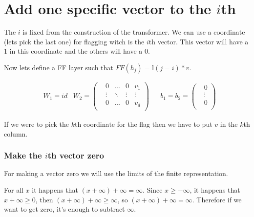 \section*{Add one specific vector to the $i$th}

The $i$ is fixed from the construction of the transformer. We can use a coordinate (lets pick the last one) for flagging witch is the $i$th vector. This vector will have a 1 in this coordinate and the others  will have a 0.

Now lets define a FF layer such that $FF(h_j) = \mathbb{I}(j=i)*v$.

\begin{align*}
    & W_1 = id
    & W_2  = \left(\begin{matrix}
        & 0         &\dots  &0      & v_1       \\
        & \vdots    &\ddots &\vdots & \vdots    \\
        & 0         &\dots  &0      & v_d       \\
    \end{matrix}\right) &
    & b_1 = b_2 = \left(\begin{matrix}
        & 0      \\
        & \vdots \\
        & 0      \\
    \end{matrix}\right) 
\end{align*}

If we were to pick the $k$th coordinate for the flag then we have to put $v$ in the $k$th column.

\subsubsection*{Make the $i$th vector zero}

For making a vector zero we will use the limits of the finite representation.

For all $x$ it happens that $(x + \infty) + \infty = \infty$. Since $x \ge -\infty$, it happens that $x + \infty \ge 0$, then $(x + \infty) + \infty \ge \infty$, so $(x + \infty) + \infty = \infty$. Therefore if we want to get zero, it's enough to subtract $\infty$.


